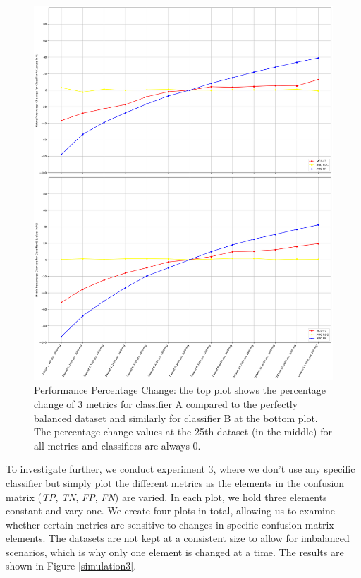 \documentclass[12pt, oneside]{amsart}
\theoremstyle{definition}
\theoremstyle{remark}
\numberwithin{equation}{section}
\begin{document}
\begin{figure}
    \centering
    \includegraphics[scale=0.27]{Report/Figure/simulation2.jpg}
    \caption{Performance Percentage Change: the top plot shows the percentage change of 3 metrics for classifier A compared to the perfectly balanced dataset and similarly for classifier B at the bottom plot. The percentage change values at the 25th dataset (in the middle) for all metrics and classifiers are always 0. }
    \label{simulation2}
\end{figure}
\FloatBarrier

To investigate further, we conduct experiment 3, where we don't use any specific classifier but simply plot the different metrics as the elements in the confusion matrix (\textit{TP}, \textit{TN}, \textit{FP}, \textit{FN}) are varied. In each plot, we hold three elements constant and vary one. We create four plots in total, allowing us to examine whether certain metrics are sensitive to changes in specific confusion matrix elements. The datasets are not kept at a consistent size to allow for imbalanced scenarios, which is why only one element is changed at a time. The results are shown in Figure \ref{simulation3}.\\
\end{document}
